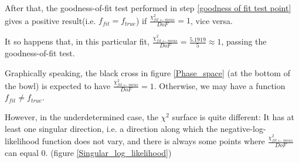 \documentclass[a4paper, 12pt]{article}
\newcommand{\chifit}{\frac{\chi^2_{fit\leftarrow meas}}{DoF} }
\begin{document}
After that, the goodness-of-fit test performed in step \ref{goodness of fit test point} gives a positive result(i.e. $f_{fit}=f_{true}$) if $\chifit=1$, vice versa. 

It so happens that, in this particular fit, $\chifit=\frac{5.1919}{5}\approx 1$, passing the goodness-of-fit test.

Graphically speaking, the black cross in figure \ref{Phase_space} (at the bottom of the bowl) is expected to have $\chifit=1$. Otherwise, we may have a function $f_{fit}\neq f_{true}$.

However, in the underdetermined case, the $\chi^2$ surface is quite different: It has at least one singular direction, i.e. a direction along which the negative-log-likelihood function does not vary, and there is always some points where $\chifit$ can equal 0. (figure \ref{Singular_log_likelihood})
\end{document}
